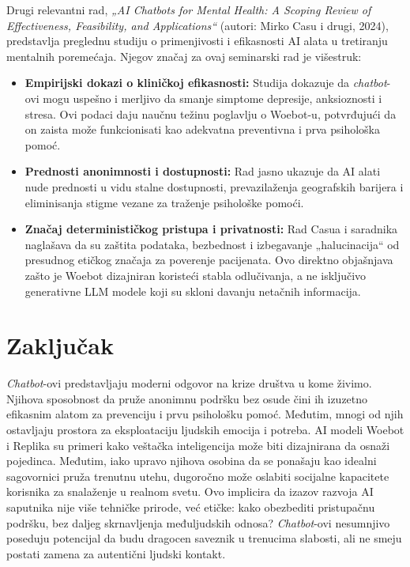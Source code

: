 \documentclass{article}
\begin{document}
Drugi relevantni rad, \textit{„AI Chatbots for Mental Health: A Scoping Review of Effectiveness, Feasibility, and Applications“} (autori: Mirko Casu i drugi, 2024), predstavlja preglednu studiju o primenjivosti i efikasnosti AI alata u tretiranju mentalnih poremećaja. Njegov značaj za ovaj seminarski rad je višestruk:
\begin{itemize}
    \item \textbf{Empirijski dokazi o kliničkoj efikasnosti:} Studija dokazuje da \textit{chatbot}-ovi mogu uspešno i merljivo da smanje simptome depresije, anksioznosti i stresa. Ovi podaci daju naučnu težinu poglavlju o Woebot-u, potvrđujući da on zaista može funkcionisati kao adekvatna preventivna i prva psihološka pomoć.
    \item \textbf{Prednosti anonimnosti i dostupnosti:} Rad jasno ukazuje da AI alati nude prednosti u vidu stalne dostupnosti, prevazilaženja geografskih barijera i eliminisanja stigme vezane za traženje psihološke pomoći.
    \item \textbf{Značaj determinističkog pristupa i privatnosti:} Rad Casua i saradnika naglašava da su zaštita podataka, bezbednost i izbegavanje „halucinacija“ od presudnog etičkog značaja za poverenje pacijenata. Ovo direktno objašnjava zašto je Woebot dizajniran koristeći stabla odlučivanja, a ne isključivo generativne LLM modele koji su skloni davanju netačnih informacija.
\end{itemize}

\section{Zaključak}

\textit{Chatbot}-ovi predstavljaju moderni odgovor na krize društva u kome živimo. Njihova sposobnost da pruže anonimnu podršku  bez osude čini ih izuzetno efikasnim alatom za prevenciju i prvu psihološku pomoć. Međutim, mnogi od njih ostavljaju prostora za eksploataciju ljudskih emocija i potreba.
AI modeli Woebot i Replika su primeri kako veštačka inteligencija može biti dizajnirana da osnaži pojedinca. Međutim, iako upravo njihova osobina da se ponašaju kao idealni sagovornici pruža trenutnu utehu, dugoročno može oslabiti socijalne kapacitete korisnika za snalaženje u realnom svetu. 
Ovo implicira da izazov razvoja AI saputnika nije više tehničke prirode, već etičke: kako obezbediti pristupačnu podršku, bez daljeg skrnavljenja međuljudskih odnosa?
\textit{Chatbot}-ovi nesumnjivo poseduju potencijal da budu dragocen saveznik u trenucima slabosti, ali ne smeju postati zamena za autentični ljudski kontakt.

\newpage

\printbibliography[title={Literatura}]
\end{document}
